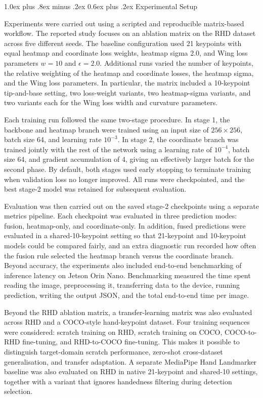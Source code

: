 \documentclass[10pt,letterpaper,twocolumn]{article}
\makeatletter
\renewcommand\subsection{\@startsection{subsection}{2}{\z@}%
  {1.0ex plus .8ex minus .2ex}%
  {0.6ex plus .2ex}%
  {\normalfont\itshape}}
\makeatother
\begin{document}
\subsection{Experimental Setup}

Experiments were carried out using a scripted and reproducible matrix-based workflow. The reported study focuses on an ablation matrix on the RHD dataset across five different seeds. The baseline configuration used 21 keypoints with equal heatmap and coordinate loss weights, heatmap sigma 2.0, and Wing loss parameters $w = 10$ and $\epsilon = 2.0$. Additional runs varied the number of keypoints, the relative weighting of the heatmap and coordinate losses, the heatmap sigma, and the Wing loss parameters. In particular, the matrix included a 10-keypoint tip-and-base setting, two loss-weight variants, two heatmap-sigma variants, and two variants each for the Wing loss width and curvature parameters.

Each training run followed the same two-stage procedure. In stage 1, the backbone and heatmap branch were trained using an input size of $256 \times 256$, batch size 64, and learning rate $10^{-3}$. In stage 2, the coordinate branch was trained jointly with the rest of the network using a learning rate of $10^{-4}$, batch size 64, and gradient accumulation of 4, giving an effectively larger batch for the second phase. By default, both stages used early stopping to terminate training when validation loss no longer improved. All runs were checkpointed, and the best stage-2 model was retained for subsequent evaluation.

Evaluation was then carried out on the saved stage-2 checkpoints using a separate metrics pipeline. Each checkpoint was evaluated in three prediction modes: fusion, heatmap-only, and coordinate-only. In addition, fused predictions were evaluated in a shared-10-keypoint setting so that 21-keypoint and 10-keypoint models could be compared fairly, and an extra diagnostic run recorded how often the fusion rule selected the heatmap branch versus the coordinate branch. Beyond accuracy, the experiments also included end-to-end benchmarking of inference latency on Jetson Orin Nano. Benchmarking measured the time spent reading the image, preprocessing it, transferring data to the device, running prediction, writing the output JSON, and the total end-to-end time per image.

Beyond the RHD ablation matrix, a transfer-learning matrix was also evaluated across RHD and a COCO-style hand-keypoint dataset. Four training sequences were considered: scratch training on RHD, scratch training on COCO, COCO-to-RHD fine-tuning, and RHD-to-COCO fine-tuning. This makes it possible to distinguish target-domain scratch performance, zero-shot cross-dataset generalisation, and transfer adaptation. A separate MediaPipe Hand Landmarker baseline was also evaluated on RHD in native 21-keypoint and shared-10 settings, together with a variant that ignores handedness filtering during detection selection.
\end{document}
